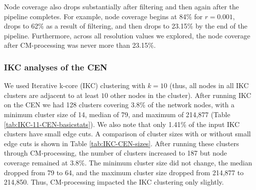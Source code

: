 \documentclass[11pt]{article}   	%
\begin{document}
Node coverage also drops substantially after filtering and then again after the pipeline completes.
For example,
node coverage begins at 84\% for $r=0.001$, drops to 62\% as a result of filtering, and then drops to 23.15\% by the end of the
pipeline.
Furthermore,
across all resolution values we explored, the node coverage after CM-processing was never more than 23.15\%.



\subsubsection{IKC analyses of the CEN}
 
 

We used Iterative k-core (IKC) clustering with $k=10$ (thus, all nodes in all  IKC clusters are adjacent to at least $10$ other nodes in the cluster). 
After running IKC on the CEN we had 128 clusters covering 3.8\% of the network nodes, with a minimum cluster size of 14, median of 79, and maximum of 214,877 (Table \ref{tab:IKC-11-CEN-basicstats}). 
We also note that  only 1.41\% of the input IKC clusters have small edge cuts.
A comparison of cluster sizes with or without small edge cuts is shown in  Table \ref{tab:IKC-CEN-sizes}.
 After running these clusters through CM-processing, the number of clusters increased to 187 but node coverage remained at 3.8\%.   The  minimum cluster size did not change, the median dropped from 79 to 64, and the maximum cluster size dropped from 214,877 to 214,850. 
 Thus, CM-processing impacted the IKC clustering only slightly.  





\end{document}
